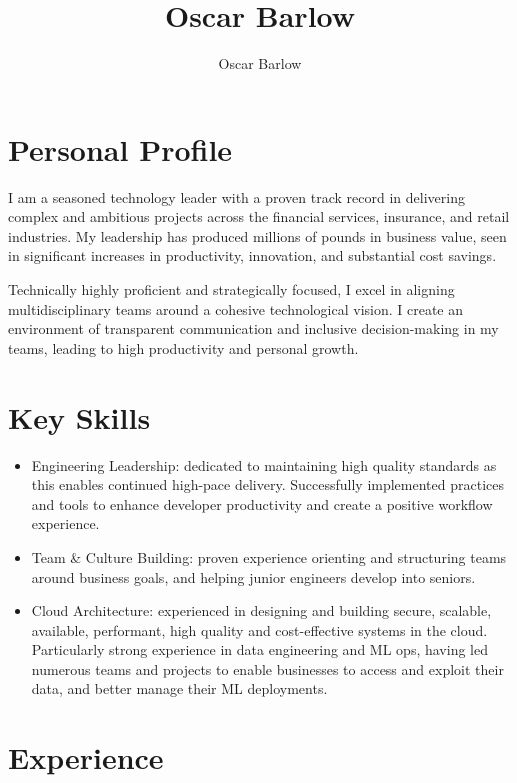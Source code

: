 \documentclass[a4paper]{scrartcl}
\author{Oscar Barlow}
\title{Oscar Barlow}
\date{}
\begin{document}
\maketitle

\section*{Personal Profile}
 { %
  \setlength{\parskip}{6pt plus 2pt minus 1pt}
  I am a seasoned technology leader with a proven track record in
  delivering complex and ambitious projects across the financial services,
  insurance,
  and retail industries. My leadership has produced
  millions of pounds in business value, seen in significant increases in
  productivity, innovation, and substantial cost savings.

  Technically highly proficient and strategically focused, I excel in aligning
  multidisciplinary
  teams around a cohesive technological vision. I create an environment of
  transparent communication and inclusive decision-making in my teams, leading to
  high productivity and personal growth.
 } %

\section*{Key Skills}
\begin{itemize}
	\item Engineering Leadership: dedicated to maintaining high quality standards as this enables continued high-pace delivery. Successfully implemented practices and tools to enhance developer productivity and create a positive workflow experience.
	\item Team \& Culture Building: proven experience orienting and structuring teams around business goals, and helping junior engineers develop into seniors.
	\item Cloud Architecture: experienced in designing and building secure,
	      scalable, available, performant, high quality and cost-effective
	      systems in the
	      cloud. Particularly strong experience in data engineering and ML ops, having led numerous teams and projects to enable businesses to access and exploit their data, and better manage their ML deployments.
\end{itemize}

\section*{Experience}
\end{document}

